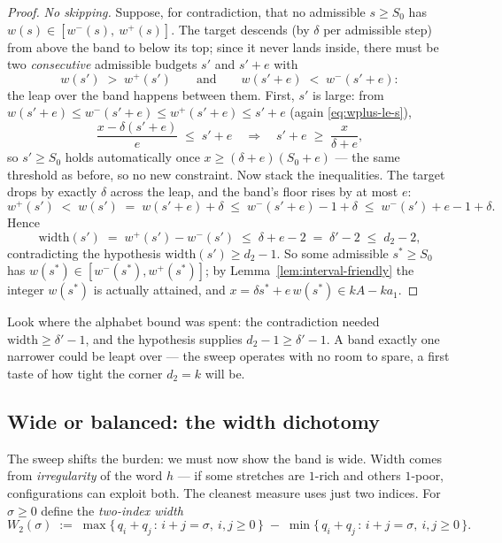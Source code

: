 \documentclass[11pt,reqno]{amsart}
\theoremstyle{plain}
\theoremstyle{definition}
\theoremstyle{remark}
\begin{document}
\begin{proof}
\emph{No skipping.} Suppose, for contradiction, that no admissible $s \ge S_0$ has
$w(s) \in [w^-(s),\ w^+(s)]$. The target descends (by $\delta$ per admissible
step) from above the band to below its top; since it never lands inside, there must
be two \emph{consecutive} admissible budgets $s'$ and $s' + e$ with
\[
  w(s') \;>\; w^+(s')
  \qquad\text{and}\qquad
  w(s' + e) \;<\; w^-(s' + e) :
\]
the leap over the band happens between them. First, $s'$ is large: from
$w(s'+e) \le w^-(s'+e) \le w^+(s'+e) \le s' + e$ (again \eqref{eq:wplus-le-s}),
\[
  \frac{x - \delta(s'+e)}{e} \;\le\; s' + e
  \quad\Longrightarrow\quad
  s' + e \;\ge\; \frac{x}{\delta + e} ,
\]
so $s' \ge S_0$ holds automatically once $x \ge (\delta + e)(S_0 + e)$ --- the same
threshold as before, so no new constraint. Now stack the inequalities. The target
drops by exactly $\delta$ across the leap, and the band's floor rises by at most
$e$:
\[
  w^+(s') \;<\; w(s') \;=\; w(s' + e) + \delta
          \;\le\; w^-(s' + e) - 1 + \delta
          \;\le\; w^-(s') + e - 1 + \delta .
\]
Hence
\[
  \mathrm{width}(s') \;=\; w^+(s') - w^-(s') \;\le\; \delta + e - 2 \;=\; \delta' - 2
  \;\le\; d_2 - 2 ,
\]
contradicting the hypothesis $\mathrm{width}(s') \ge d_2 - 1$. So some admissible
$s^* \ge S_0$ has $w(s^*) \in [w^-(s^*), w^+(s^*)]$; by
Lemma~\ref{lem:interval-friendly} the integer $w(s^*)$ is actually attained, and
$x = \delta s^* + e\,w(s^*) \in kA - k a_1$.
\end{proof}

Look where the alphabet bound was spent: the contradiction needed
$\mathrm{width} \ge \delta' - 1$, and the hypothesis supplies $d_2 - 1 \ge \delta' -
1$. A band exactly one narrower could be leapt over --- the sweep operates with no
room to spare, a first taste of how tight the corner $d_2 = k$ will be.

\subsection{Wide or balanced: the width dichotomy}

The sweep shifts the burden: we must now show the band is wide. Width comes from
\emph{irregularity} of the word $h$ --- if some stretches are $1$-rich and others
$1$-poor, configurations can exploit both. The cleanest measure uses just two
indices. For $\sigma \ge 0$ define the \emph{two-index width}
\[
  W_2(\sigma) \;:=\; \max\{\, q_i + q_j \,:\, i + j = \sigma,\ i,j \ge 0 \,\}
            \;-\; \min\{\, q_i + q_j \,:\, i + j = \sigma,\ i,j \ge 0 \,\} .
\]
\end{document}
